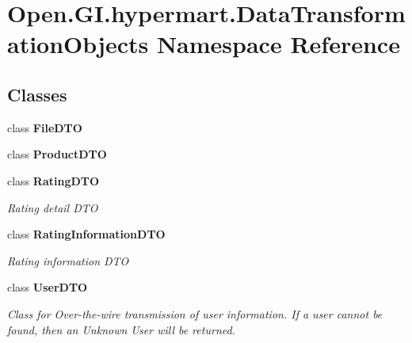 \section{Open.\+G\+I.\+hypermart.\+Data\+Transformation\+Objects Namespace Reference}
\label{namespace_open_1_1_g_i_1_1hypermart_1_1_data_transformation_objects}
\subsection*{Classes}
\begin{DoxyCompactItemize}
\item 
class \textbf{ File\+D\+TO}
\item 
class \textbf{ Product\+D\+TO}
\item 
class \textbf{ Rating\+D\+TO}
\begin{DoxyCompactList}\small\item\em Rating detail D\+TO \end{DoxyCompactList}\item 
class \textbf{ Rating\+Information\+D\+TO}
\begin{DoxyCompactList}\small\item\em Rating information D\+TO \end{DoxyCompactList}\item 
class \textbf{ User\+D\+TO}
\begin{DoxyCompactList}\small\item\em Class for Over-\/the-\/wire transmission of user information. If a user cannot be found, then an Unknown User will be returned. \end{DoxyCompactList}\end{DoxyCompactItemize}
